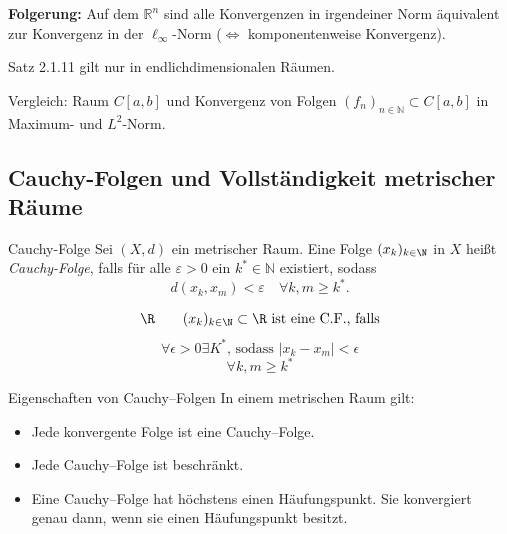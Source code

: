 \begin{bemerkungbox}
    \textbf{Folgerung:} Auf dem $\mathbb{R}^n$ sind alle Konvergenzen in irgendeiner Norm äquivalent zur Konvergenz in der $\ell_\infty$-Norm ($\Longleftrightarrow$ komponentenweise Konvergenz).

    \vspace{1em}

    Satz 2.1.11 gilt nur in endlichdimensionalen Räumen.

    \vspace{1em}

    Vergleich: Raum $C[a,b]$ und Konvergenz von Folgen $(f_n)_{n\in\mathbb{N}}\subset C[a,b]$ in Maximum- und $L^2$-Norm.
\end{bemerkungbox}

\subsection*{Cauchy-Folgen und Vollständigkeit metrischer Räume}

\begin{definition}{Cauchy-Folge}
    Sei $(X,d)$ ein metrischer Raum. Eine Folge $(x_k)_{k\in\N}$ in $X$ heißt \emph{Cauchy-Folge}, falls für alle $\varepsilon>0$ ein $k^*\in\mathbb{N}$ existiert, sodass
    $$
        d(x_k,x_m) < \varepsilon \quad \forall k,m \ge k^*.
    $$
\end{definition}

\begin{bemerkungbox}
    $$
        \R \qquad (x_k)_{k\in\N} \subset \R \text{ ist eine C.F., falls}
    $$
    $$
        \forall \epsilon > 0 \exists K^* \text{, sodass } |x_k - x_m| < \epsilon
    $$
    $$
        \forall k,m \geq k^*
    $$
\end{bemerkungbox}

\begin{satz}{Eigenschaften von Cauchy--Folgen}
    In einem metrischen Raum gilt:
    \begin{itemize}
        \item[(i)] Jede konvergente Folge ist eine Cauchy--Folge.
        \item[(ii)] Jede Cauchy--Folge ist beschränkt.
        \item[(iii)] Eine Cauchy--Folge hat höchstens einen Häufungspunkt. Sie konvergiert genau dann, wenn sie einen Häufungspunkt besitzt.
    \end{itemize}
\end{satz}

